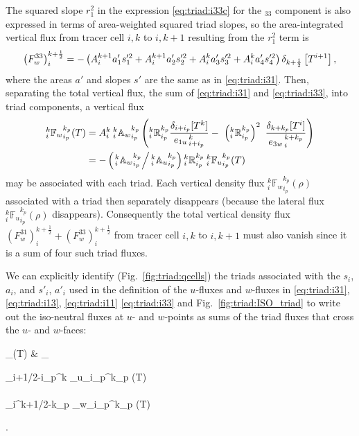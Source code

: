 The squared slope $r_1^2$ in the expression \eqref{eq:triad:i33c} for the
$_{33}$ component is also expressed in terms of area-weighted
squared triad slopes, so the area-integrated vertical flux from tracer
cell $i,k$ to $i,k+1$ resulting from the $r_1^2$ term is
\begin{equation}
  \label{eq:triad:i33}
  \left( F_w^{33} \right) _i^{k+\frac{1}{2}} =
    - \left( {A}_i^{k+1} a_{1}' s_{1}'^2
    + {A}_i^{k+1} a_{2}' s_{2}'^2
    + {A}_i^k a_{3}' s_{3}'^2
    + {A}_i^k a_{4}' s_{4}'^2 \right)\delta_{k+\frac{1}{2}} \left[ T^{i+1} \right],
\end{equation}
where the areas $a'$ and slopes $s'$ are the same as in
\eqref{eq:triad:i31}.
Then, separating the total vertical flux, the sum of \eqref{eq:triad:i31} and
\eqref{eq:triad:i33}, into triad components,  a vertical flux
\begin{align}
  \label{eq:triad:vertflux-triad}
  _i^k {\mathbb{F}_w}_{i_p}^{k_p} (T)
  &= {A}_i^k{\: }_i^k{\mathbb{A}_w}_{i_p}^{k_p}
  \left(
    {_i^k\mathbb{R}_{i_p}^{k_p}}\frac{ \delta_{i+ i_p}[T^k] }{ {e_{1u}}_{\,i + i_p}^{\,k} }
    -\ \left({_i^k\mathbb{R}_{i_p}^{k_p}}\right)^2 \
    \frac{ \delta_{k+k_p} [T^i] }{{e_{3w}}_{\,i}^{\,k+k_p} }
  \right) \\
  &= - \left(\left.{ }_i^k{\mathbb{A}_w}_{i_p}^{k_p}\right/{ }_i^k{\mathbb{A}_u}_{i_p}^{k_p}\right)
   {_i^k\mathbb{R}_{i_p}^{k_p}}{\: }_i^k{\mathbb{F}_u}_{i_p}^{k_p} (T) \label{eq:triad:vertflux-triad2}
\end{align}
may be associated with each triad. Each vertical density flux $_i^k {\mathbb{F}_w}_{i_p}^{k_p} (\rho)$
associated with a triad then separately disappears (because the
lateral flux $_i^k{\mathbb{F}_u}_{i_p}^{k_p} (\rho)$
disappears). Consequently the total vertical density flux $\left( F_w^{31} \right)_i ^{k+\frac{1}{2}} +
\left( F_w^{33} \right)_i^{k+\frac{1}{2}}$ from tracer cell $i,k$
to $i,k+1$ must also vanish since it is a sum of four such triad
fluxes.

We can explicitly identify (Fig.~\ref{fig:triad:qcells}) the triads associated with the $s_i$, $a_i$, and $s'_i$, $a'_i$ used in the definition of
the $u$-fluxes and $w$-fluxes in
\eqref{eq:triad:i31}, \eqref{eq:triad:i13}, \eqref{eq:triad:i11} \eqref{eq:triad:i33} and
Fig.~\ref{fig:triad:ISO_triad} to  write out the iso-neutral fluxes at $u$- and
$w$-points as sums of the triad fluxes that cross the $u$- and $w$-faces:
\begin{flalign} \label{Eq_iso_flux} _(T) &\equiv
  \sum_{\substack{i_p,\,k_p}}
  \begin{pmatrix}
    {_{i+1/2-i_p}^k {_u}_{i_p}^{k_p} } (T)      \\
    \\
    {_i^{k+1/2-k_p} {_w}_{i_p}^{k_p} } (T)      \\
  \end{pmatrix}.
\end{flalign}
